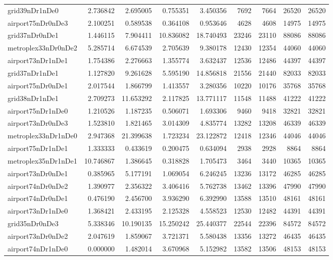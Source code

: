 \begin{longtable}{|l|r|r|r|r|r|r|r|r|}
grid39nDr1nDe0 & 2.736842 & 2.695005 & 0.755351 & 3.450356 & 7692 & 7664 & 26520 & 26520 \\
airport75nDr0nDe3 & 2.100251 & 0.589538 & 0.364108 & 0.953646 & 4628 & 4608 & 14975 & 14975 \\
grid37nDr0nDe1 & 1.446115 & 7.904411 & 10.836082 & 18.740493 & 23246 & 23110 & 88086 & 88086 \\
metroplex33nDr0nDe2 & 5.285714 & 6.674539 & 2.705639 & 9.380178 & 12430 & 12354 & 44060 & 44060 \\
airport73nDr1nDe1 & 1.754386 & 2.276663 & 1.355774 & 3.632437 & 12536 & 12486 & 44397 & 44397 \\
grid37nDr1nDe1 & 1.127820 & 9.261628 & 5.595190 & 14.856818 & 21556 & 21440 & 82033 & 82033 \\
airport75nDr0nDe1 & 2.017544 & 1.866799 & 1.413557 & 3.280356 & 10220 & 10176 & 35768 & 35768 \\
grid38nDr1nDe1 & 2.709273 & 11.653292 & 2.117825 & 13.771117 & 11548 & 11488 & 41222 & 41222 \\
airport75nDr1nDe0 & 1.210526 & 1.187235 & 0.506071 & 1.693306 & 9460 & 9418 & 32821 & 32821 \\
airport73nDr0nDe3 & 1.523810 & 1.821465 & 3.014309 & 4.835774 & 13282 & 13208 & 46339 & 46339 \\
metroplex33nDr1nDe0 & 2.947368 & 21.399638 & 1.723234 & 23.122872 & 12418 & 12346 & 44046 & 44046 \\
airport75nDr1nDe1 & 1.333333 & 0.433619 & 0.200475 & 0.634094 & 2938 & 2928 & 8864 & 8864 \\
metroplex35nDr1nDe1 & 10.746867 & 1.386645 & 0.318828 & 1.705473 & 3464 & 3440 & 10365 & 10365 \\
airport73nDr0nDe1 & 0.385965 & 5.177191 & 1.069054 & 6.246245 & 13236 & 13172 & 46285 & 46285 \\
airport74nDr0nDe2 & 1.390977 & 2.356322 & 3.406416 & 5.762738 & 13462 & 13396 & 47990 & 47990 \\
airport74nDr0nDe1 & 0.476190 & 2.456700 & 3.936290 & 6.392990 & 13588 & 13510 & 48161 & 48161 \\
airport73nDr1nDe0 & 1.368421 & 2.433195 & 2.125328 & 4.558523 & 12530 & 12482 & 44391 & 44391 \\
grid35nDr0nDe3 & 5.338346 & 10.190135 & 15.250242 & 25.440377 & 22544 & 22396 & 84572 & 84572 \\
airport73nDr0nDe2 & 2.047619 & 1.859067 & 3.721371 & 5.580438 & 13356 & 13272 & 46435 & 46435 \\
airport74nDr1nDe0 & 0.000000 & 1.482014 & 3.670968 & 5.152982 & 13582 & 13506 & 48153 & 48153 \\

\end{longtable}
